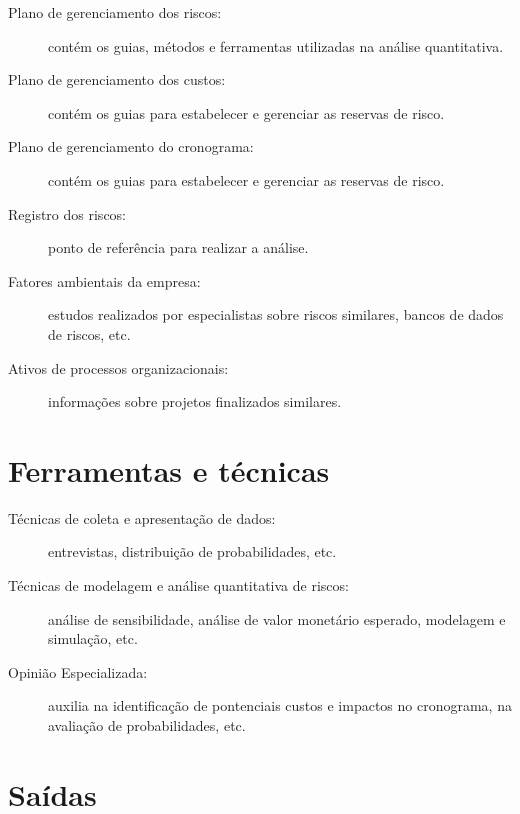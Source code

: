 \begin{description}
	
	\item[Plano de gerenciamento dos riscos:] contém os guias, métodos e ferramentas utilizadas na análise quantitativa.
	
	\item[Plano de gerenciamento dos custos:] contém os guias para estabelecer e gerenciar as reservas de risco.
	
	\item[Plano de gerenciamento do cronograma:] contém os guias para estabelecer e gerenciar as reservas de risco.
	
	\item[Registro dos riscos:] ponto de referência para realizar a análise.
	
	\item[Fatores ambientais da empresa:] estudos realizados por especialistas sobre riscos similares, bancos de dados de riscos, etc.
	
	\item[Ativos de processos organizacionais:] informações sobre projetos finalizados similares.
	
\end{description}

\section{Ferramentas e técnicas}

\begin{description}

	\item[Técnicas de coleta e apresentação de dados:] entrevistas, distribuição de probabilidades, etc.
	
	\item[Técnicas de modelagem e análise quantitativa de riscos:] análise de sensibilidade, análise de valor monetário esperado, modelagem e simulação, etc.
	
	\item[Opinião Especializada:] auxilia na identificação de pontenciais custos e impactos no cronograma, na avaliação de probabilidades, etc.
	
\end{description}

\section{Saídas}

